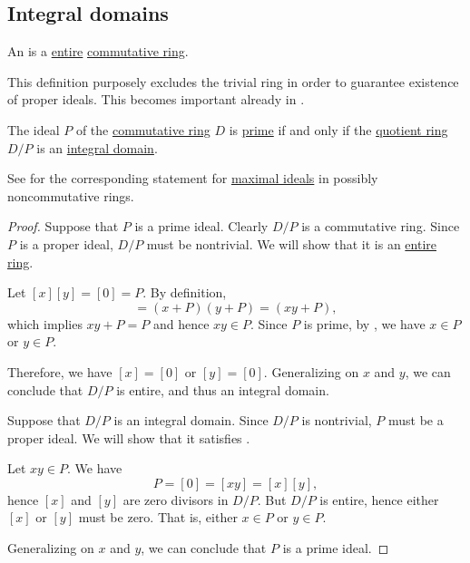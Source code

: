 \subsection{Integral domains}\label{subsec:integral_domains}

\begin{definition}\label{def:integral_domain}
  An  is a  \hyperref[def:entire_semiring]{entire} \hyperref[def:ring/commutative]{commutative ring}.

  This definition purposely excludes the trivial ring in order to guarantee existence of proper ideals. This becomes important already in .
\end{definition}

\begin{proposition}\label{thm:quotient_by_prime_ideal}
  The ideal \( P \) of the \hyperref[def:ring/commutative]{commutative ring} \( D \) is \hyperref[def:semiring_ideal/prime]{prime} if and only if the \hyperref[def:ring/quotient]{quotient ring} \( D / P \) is an \hyperref[def:integral_domain]{integral domain}.

  See  for the corresponding statement for \hyperref[def:semiring_ideal/maximal]{maximal ideals} in possibly noncommutative rings.
\end{proposition}
\begin{proof}
  \SufficiencySubProof Suppose that \( P \) is a prime ideal. Clearly \( D / P \) is a commutative ring. Since \( P \) is a proper ideal, \( D / P \) must be nontrivial. We will show that it is an \hyperref[def:entire_semiring]{entire ring}.

  Let \( [x] [y] = [0] = P \). By definition,
  \begin{equation*}
    [x] [y] = (x + P) (y + P) = (xy + P),
  \end{equation*}
  which implies \( xy + P = P \) and hence \( xy \in P \). Since \( P \) is prime, by , we have \( x \in P \) or \( y \in P \).

  Therefore, we have \( [x] = [0] \) or \( [y] = [0] \). Generalizing on \( x \) and \( y \), we can conclude that \( D / P \) is entire, and thus an integral domain.

  \NecessitySubProof Suppose that \( D / P \) is an integral domain. Since \( D / P \) is nontrivial, \( P \) must be a proper ideal. We will show that it satisfies .

  Let \( xy \in P \). We have
  \begin{equation*}
    P = [0] = [xy] = [x] [y],
  \end{equation*}
  hence \( [x] \) and \( [y] \) are zero divisors in \( D / P \). But \( D / P \) is entire, hence either \( [x] \) or \( [y] \) must be zero. That is, either \( x \in P \) or \( y \in P \).

  Generalizing on \( x \) and \( y \), we can conclude that \( P \) is a prime ideal.
\end{proof}

